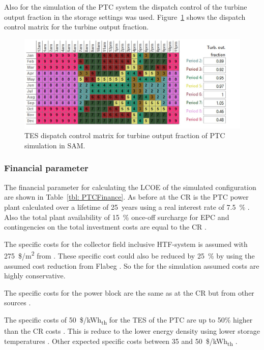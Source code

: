 Also for the simulation of the PTC system the dispatch control of the turbine output fraction in the storage settings was used. Figure~\ref{PTC_turbineoutput} shows the dispatch control matrix for the turbine output fraction.
\begin{figure}[htbp]  
\centering
\includegraphics[width=0.95\linewidth]{FIG/PTC_turbineoutput}
\caption[TES dispatch control matrix for turbine output fraction of PTC simulation in SAM.]{TES dispatch control matrix for turbine output fraction of PTC simulation in SAM.}\label{PTC_turbineoutput}
\end{figure}
\pagebreak
\subsubsection{Financial parameter}
The financial parameter for calculating the LCOE of the simulated configuration are shown in Table~\ref{tbl: PTCFinance}. As before at the CR is the PTC power plant calculated over a lifetime of 25~years using a real interest rate of 7.5~\% \cite{FraunhoferISE2013}. Also the total plant availability of  15~\% once-off surcharge for EPC and contingencies on the total investment costs are equal to the CR \cite{Platzer2014}.


The specific costs for the collector field inclusive HTF-system is assumed with 275~\$/m\textsuperscript{2} from \cite{Morin2012}. These specific cost could also be reduced by 25~\% by using the assumed cost reduction from Flabeg \cite{FLABEG_FE_GmbH2015}. So the for the simulation assumed costs are highly conservative.

The specific costs for the power block are the same as at the CR but from other sources \cite{Platzer2014}. 

The specific costs of 50~\$/kWh\textsubscript{th} for the TES of the PTC are up to 50\% higher than the CR costs \cite{Platzer2014}. This is reduce to the lower energy density using lower storage temperatures \cite{Steinmann2015}. Other expected specific costs between 35 and 50~\$/kWh\textsubscript{th}  \cite{Steinmann2012}.

